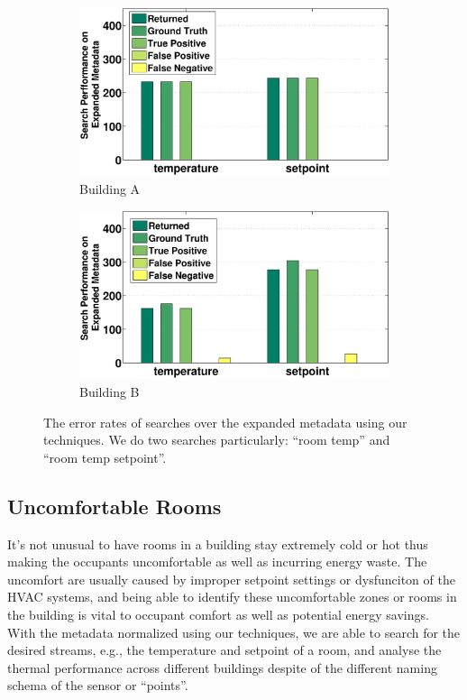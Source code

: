 \begin{figure}[h!]
\centering
	\begin{subfigure}{0.48\textwidth}
                \centering
		\includegraphics[width=\textwidth]{./figs/50-soda.eps}
                \caption{Building A}
	\end{subfigure}
	\begin{subfigure}{0.48\textwidth}
                \centering
		\includegraphics[width=\textwidth]{./figs/50-sdh.eps}
                \caption{Building B}
	\end{subfigure}
\caption{The error rates of searches over the expanded metadata using our techniques. We do two searches particularly: ``room temp'' and ``room temp setpoint''.}
\label{fig:cdf_temp}
\end{figure}

\subsection{Uncomfortable Rooms}
It's not unusual to have rooms in a building stay extremely cold or hot thus making the occupants uncomfortable as well as incurring energy waste. The uncomfort are usually caused by improper setpoint settings or dysfunciton of the HVAC systems, and being able to identify these uncomfortable zones or rooms in the building is vital to occupant comfort as well as potential energy savings. With the metadata normalized using our techniques, we are able to search for the desired streams, e.g., the temperature and setpoint of a room,  and analyse the thermal performance across different buildings despite of the different naming schema of the sensor or ``points''.

